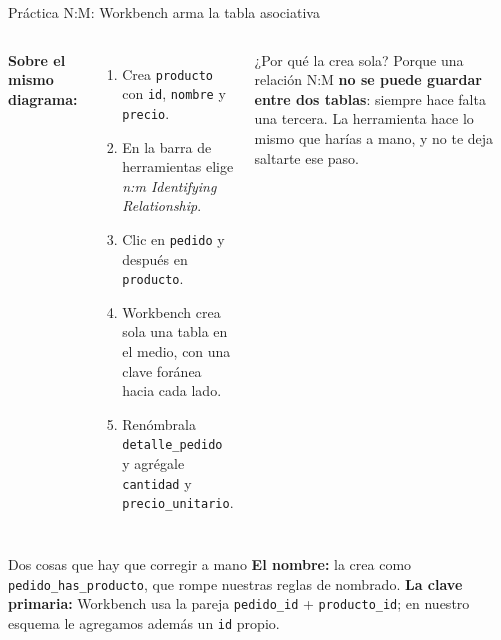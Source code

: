 \documentclass[aspectratio=169,10pt,c]{beamer}
\begin{document}
\begin{frame}{Práctica N:M: Workbench arma la tabla asociativa}
\begin{columns}[T,onlytextwidth]
\small \textbf{Sobre el mismo diagrama:}
\begin{enumerate}\setlength\itemsep{4pt}\small
  \item Crea \texttt{producto} con \texttt{id}, \texttt{nombre} y \texttt{precio}.
  \item En la barra de herramientas elige \textit{n:m Identifying Relationship}.
  \item Clic en \texttt{pedido} y después en \texttt{producto}.
  \item Workbench crea sola una tabla en el medio, con una clave foránea hacia cada lado.
  \item Renómbrala \texttt{detalle\_pedido} y agrégale \texttt{cantidad} y \texttt{precio\_unitario}.
\end{enumerate}
\begin{block}{¿Por qué la crea sola?}
\small Porque una relación N:M \textbf{no se puede guardar entre dos tablas}: siempre hace falta una tercera. La herramienta hace lo mismo que harías a mano, y no te deja saltarte ese paso.
\end{block}
\end{columns}
\vspace{0.3cm}
\begin{alertblock}{Dos cosas que hay que corregir a mano}
\small \textbf{El nombre:} la crea como \texttt{pedido\_has\_producto}, que rompe nuestras reglas de nombrado. \textbf{La clave primaria:} Workbench usa la pareja \texttt{pedido\_id} + \texttt{producto\_id}; en nuestro esquema le agregamos además un \texttt{id} propio.
\end{alertblock}
\end{frame}
\end{document}
